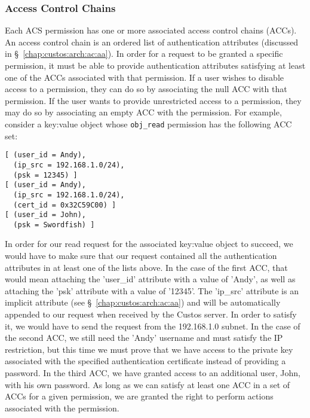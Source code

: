 \subsubsection{Access Control Chains}
\label{chap:custos:arch:ac:acc}

Each ACS permission has one or more associated access control chains
(ACCs). An access control chain is an ordered list of authentication
attributes (discussed in \S~\ref{chap:custos:arch:ac:aa}). In order for a
request to be granted a specific permission, it must be able to
provide authentication attributes satisfying at least one of the ACCs
associated with that permission. If a user wishes to disable access to
a permission, they can do so by associating the null ACC with that
permission. If the user wants to provide unrestricted access to a
permission, they may do so by associating an empty ACC with the
permission. For example, consider a key:value object whose
\texttt{obj\_read} permission has the following ACC set:

\begin{Verbatim}[samepage=true, fontsize=\footnotesize]
[ (user_id = Andy),
  (ip_src = 192.168.1.0/24),
  (psk = 12345) ]
[ (user_id = Andy),
  (ip_src = 192.168.1.0/24),
  (cert_id = 0x32C59C00) ]
[ (user_id = John),
  (psk = Swordfish) ]
\end{Verbatim}

In order for our read request for the associated key:value object to
succeed, we would have to make sure that our request contained all the
authentication attributes in at least one of the lists above. In the
case of the first ACC, that would mean attaching the 'user\_id'
attribute with a value of 'Andy', as well as attaching the 'psk'
attribute with a value of '12345'. The 'ip\_src' attribute is an
implicit attribute (see \S~\ref{chap:custos:arch:ac:aa}) and will be
automatically appended to our request when received by the Custos
server. In order to satisfy it, we would have to send the request from
the 192.168.1.0 subnet. In the case of the second ACC, we still need
the 'Andy' username and must satisfy the IP restriction, but this time
we must prove that we have access to the private key associated with
the specified authentication certificate instead of providing a
password. In the third ACC, we have granted access to an additional
user, John, with his own password. As long as we can satisfy at least
one ACC in a set of ACCs for a given permission, we are granted the
right to perform actions associated with the permission.

